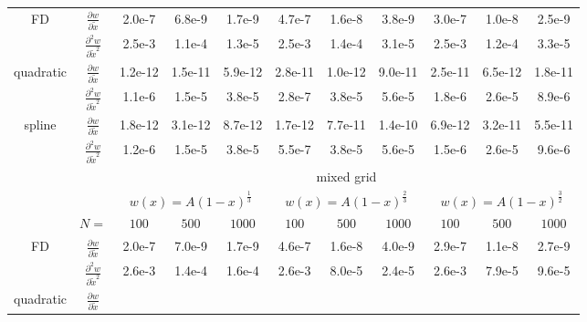 \begin{tabular}{cc|c|c|c|c|c|c|c|c|c|}
\\ \cline{1-11}
\multicolumn{1}{|c|}{\multirow{2}{*}{FD}} &
\multicolumn{1}{|c|}{$\frac{\partial w}{\partial \tilde x}$}
  &2.0e-7  &6.8e-9  &1.7e-9  &4.7e-7  &1.6e-8  &3.8e-9  &3.0e-7  &1.0e-8  &2.5e-9
\\ \cline{2-11}
\multicolumn{1}{|c|}{}                        &
\multicolumn{1}{|c|}{$\frac{\partial^2 w}{\partial \tilde x^2}$}
  &2.5e-3  &1.1e-4  &1.3e-5  &2.5e-3  &1.4e-4  &3.1e-5  &2.5e-3  &1.2e-4  &3.3e-5
\\ \cline{1-11}
\multicolumn{1}{|c|}{\multirow{2}{*}{quadratic}} &
\multicolumn{1}{|c|}{$\frac{\partial w}{\partial \tilde x}$}
  &1.2e-12  &1.5e-11  &5.9e-12  &2.8e-11  &1.0e-12  &9.0e-11  &2.5e-11  &6.5e-12  &1.8e-11
\\ \cline{2-11}
\multicolumn{1}{|c|}{}                        &
\multicolumn{1}{|c|}{$\frac{\partial^2 w}{\partial \tilde x^2}$}
  &1.1e-6  &1.5e-5  &3.8e-5  &2.8e-7  &3.8e-5  &5.6e-5  &1.8e-6  &2.6e-5  &8.9e-6
\\ \cline{1-11}
\multicolumn{1}{|c|}{\multirow{2}{*}{spline}} &
\multicolumn{1}{|c|}{$\frac{\partial w}{\partial \tilde x}$}
  &1.8e-12  &3.1e-12  &8.7e-12  &1.7e-12  &7.7e-11  &1.4e-10  &6.9e-12  &3.2e-11  &5.5e-11
\\ \cline{2-11}
\multicolumn{1}{|c|}{}                        &
\multicolumn{1}{|c|}{$\frac{\partial^2 w}{\partial \tilde x^2}$}
  &1.2e-6  &1.5e-5  &3.8e-5  &5.5e-7  &3.8e-5  &5.6e-5  &1.5e-6  &2.6e-5  &9.6e-6
\\ \cline{1-11}
& & \multicolumn{9}{|c|}{mixed grid}
\\ \cline{3-11}
& & \multicolumn{3}{|c|}{$w(x)=A(1-x)^\frac{1}{3}$} &  \multicolumn{3}{|c|}{$w(x)=A(1-x)^\frac{2}{3}$} &  \multicolumn{3}{|c|}{$w(x)=A(1-x)^\frac{3}{2}$}
\\ \cline{2-11}
& \multicolumn{1}{|c|}{$N=$} & $100$ & $500$ & $1000$ & $100$ & $500$ & $1000$ & $100$ & $500$ & $1000$
\\ \cline{1-11}
\multicolumn{1}{|c|}{\multirow{2}{*}{FD}} &
\multicolumn{1}{|c|}{$\frac{\partial w}{\partial \tilde x}$}
  &2.0e-7  &7.0e-9  &1.7e-9  &4.6e-7  &1.6e-8  &4.0e-9  &2.9e-7  &1.1e-8  &2.7e-9
\\ \cline{2-11}
\multicolumn{1}{|c|}{}                        &
\multicolumn{1}{|c|}{$\frac{\partial^2 w}{\partial \tilde x^2}$}
  &2.6e-3  &1.4e-4  &1.6e-4  &2.6e-3  &8.0e-5  &2.4e-5  &2.6e-3  &7.9e-5  &9.6e-5
\\ \cline{1-11}
\multicolumn{1}{|c|}{\multirow{2}{*}{quadratic}} &
\multicolumn{1}{|c|}{$\frac{\partial w}{\partial \tilde x}$}

\end{tabular}
